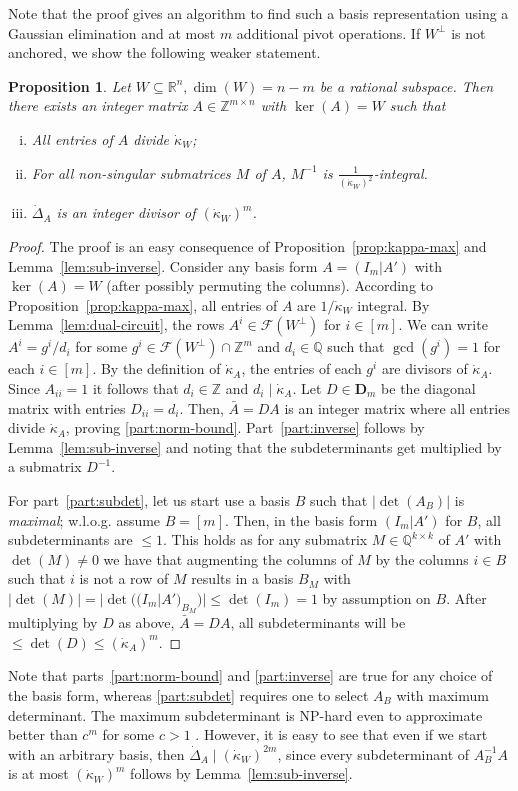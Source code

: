 \documentclass[11pt, a4paper]{article}
\newcommand{\1}{\mathbbm{1}}
\newcommand{\kd}{{\dot{\kappa}}}
\newcommand{\Q}{\mathbb{Q}}
\newcommand{\divides}{\mid}
\newcommand{\EE}{\mathcal F}
\newcommand{\bD}{\mathbf{D}}
\newtheorem{prop}[theorem]{Proposition}
\theoremstyle{case}
\newcommand{\R}{\mathbb{R}}
\newcommand{\Z}{\mathbb{Z}}
\begin{document}
Note that the proof gives an algorithm to find such a basis representation using a Gaussian elimination and at most $m$ additional pivot operations.
If $W^\perp$ is not anchored, we show the following weaker statement.
\begin{prop} \label{prop:B_inverse_General}
  Let $W \subseteq \R^n, \dim(W) = n - m$ be a rational subspace. Then there exists an integer matrix $A\in\Z^{m\times n}$ with $\ker(A) = W$ such that
  \begin{enumerate}[(i)]
    \item\label{part:norm-bound} All entries of $A$ divide $\kd_W$;
    \item\label{part:inverse} For all non-singular submatrices $M$ of $A$, $M^{-1}$ is $\frac{1}{(\kd_W)^2}$-integral.
    \item\label{part:subdet} $\dot\Delta_A$ is an integer divisor of $(\kd_W)^{m}$.
  \end{enumerate}
\end{prop}
\begin{proof}
The proof is an easy consequence of Proposition~\ref{prop:kappa-max} and Lemma~\ref{lem:sub-inverse}. Consider any basis form $A=(I_m|A')$ with  $\ker(A)=W$ (after possibly permuting the columns). According to Proposition~\ref{prop:kappa-max},  all entries of $A$ are $1/\dot\kappa_W$ integral.
By Lemma~\ref{lem:dual-circuit}, the rows $A^i\in\EE(W^\perp)$ for $i\in [m]$. We can write $A^i=g^i/d_i$ for some  $g^i\in \EE(W^\perp)\cap \Z^m$ and $d_i\in \Q$ such that $\gcd(g^i)=1$ for each $i\in [m]$. By the definition of $\kd_A$, the entries of each $g^i$ are divisors of $\kd_A$. Since $A_{ii}=1$ it follows that $d_i\in \Z$ and $d_i\divides \kd_A$. Let $D\in\bD_m$ be the diagonal matrix with entries $D_{ii}=d_i$. Then, $\bar A=DA$ is an integer matrix where all entries divide $\kd_A$, proving \ref{part:norm-bound}.
Part~\ref{part:inverse} follows  by Lemma~\ref{lem:sub-inverse} and noting that the subdeterminants get multiplied by a submatrix $D^{-1}$.

For part~\ref{part:subdet}, let us start use a basis $B$ such that $|\det(A_B)|$ is \emph{maximal}; w.l.o.g. assume $B=[m]$. 
Then, in the basis form $(I_m|A')$ for $B$, all subdeterminants are $\le 1$. This holds as for any submatrix $M \in \Q^{k \times k}$ of $A'$ with $\det(M) \neq 0$ we have that augmenting the columns of $M$ by the columns $i \in B$ such that $i$ is not a row of $M$ results in a basis $B_M$ with $|\det(M)| = |\det\big((I_m | A')_{B_M}\big)| \le \det(I_m) = 1$ by assumption on $B$. After multiplying by $D$ as above, $\bar A=DA$, all subdeterminants will be $\le \det(D)\le (\kd_A)^m$.
\end{proof}
Note that parts~\ref{part:norm-bound} and \ref{part:inverse} are true for any choice of the basis form, whereas \ref{part:subdet} requires one to select $A_B$ with maximum determinant. The maximum subdeterminant is NP-hard even to approximate better than $c^m$ for some $c>1$ \cite{DiSumma2014}. However,
it is easy to see that even if we start with an arbitrary basis, then $\dot\Delta_A\divides(\kd_W)^{2m}$, since every subdeterminant of $A_B^{-1} A$ is at most $(\kd_W)^m$ follows by Lemma~\ref{lem:sub-inverse}.
\end{document}
